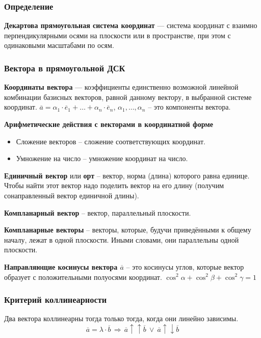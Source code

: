 \documentclass{article}
\begin{document}
\subsubsection{Определение}
\textbf{Декартова прямоугольная система координат} — система координат с взаимно
перпендикулярными осями на плоскости или в пространстве, при этом с одинаковыми
масштабами по осям.

\subsubsection{Вектора в прямоугольной ДСК}

\textbf{Координаты вектора} — коэффициенты единственно возможной линейной комбинации
базисных векторов, равной данному вектору, в выбранной системе координат.
$\overline{a} = \alpha_1\cdot\overline{e}_1 +\ldots+ \alpha_n\cdot\overline{e}_n$, $\alpha_1,\ldots,\alpha_n$ -- это компоненты вектора.

\textbf{Арифметические действия с векторами в координатной форме}
\begin{itemize}
    \item Сложение векторов -- сложение соответствующих координат.
    \item Умножение на число -- умножение координат на число.
\end{itemize}
\textbf{Единичный вектор} или \textbf{орт} -- вектор, норма (длина) которого равна единице.
Чтобы найти этот вектор надо поделить вектор на его длину (получим сонаправленный
вектор единичной длины).

\textbf{Компланарный вектор} -- вектор, параллельный плоскости.

\textbf{Компланарные векторы} -- векторы, которые, будучи приведёнными к общему началу,
лежат в одной плоскости. Иными словами, они параллельны одной плоскости.

\textbf{Направляющие косинусы вектора $\overline{a}$} – это косинусы углов,
которые вектор образует с положительными полуосями
координат. $\cos^2\alpha + \cos^2\beta + \cos^2\gamma = 1$
\subsubsection{Критерий коллинеарности}
Два вектора коллинеарны тогда только тогда, когда они линейно зависимы. $$\overline{a}=\lambda\cdot\overline{b}\,\Rightarrow\,\overline{a}\uparrow\uparrow\overline{b}\: \vee \:\overline{a}\uparrow\downarrow\overline{b}$$

\newpage
\end{document}
